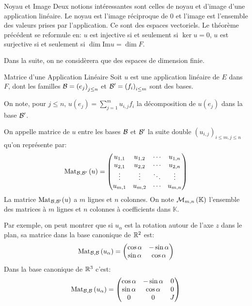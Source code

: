 \documentclass{classe}
\renewcommand*{\K}{\mathbb{K}}
\begin{document}
\begin{remarque}{Noyau et Image}{}
Deux notions intéressantes sont celles de noyau et d'image d'une application linéaire. Le noyau est l'image réciproque de $0$ et l'image est l'ensemble des valeurs prises par l'application.
Ce sont des espaces vectoriels.
Le théorème précédent se reformule en: $u$ est injective si et seulement si $\ker u = 0$, $u$ est surjective si et seulement si $\dim \mathrm{Im} u = \dim F$.
\end{remarque}

Dans la suite, on ne considèrera que des espaces de dimension finie.

\begin{définition}{Matrice d'une Application Linéaire}{}
	Soit $u$ est une application linéaire de $E$ dans $F$, dont les familles $\mathcal{B} = \left(e_{j}\right)_{j\leq n}$ et $\mathcal{B}' = \left(f_{i}\right)_{i\leq m}$ sont des bases.

	On note, pour $j \leq n$, $u\left( e_{j} \right) = \sum_{j = 1}^{m}u_{i, j}f_{i}$ la décomposition de $u(e_{j})$ dans la base $\mathcal{B}'$.

	On appelle matrice de $u$ entre les bases $\mathcal{B}$ et $\mathcal{B}'$ la suite double $\left( u_{i, j} \right)_{i \leq m, j\leq n}$ qu'on représente par:
	\begin{equation*}
		\operatorname{Mat}_{\mathcal{B}, \mathcal{B}'}\left( u \right) = \begin{pmatrix}
			u_{1, 1} & u_{1, 2} & \cdots & u_{1, n}\\
			u_{2, 1} & u_{2, 2} & \cdots & u_{2, n}\\
			\vdots & \vdots & \ddots & \vdots \\
			u_{m, 1} & u_{m, 2} & \cdots & u_{m, n}
		\end{pmatrix}
	\end{equation*}
	La matrice $\operatorname{Mat}_{\mathcal{B}, \mathcal{B}'}(u)$ a $m$ lignes et $n$ colonnes. On note $\M_{m, n}\left( \K \right)$ l'ensemble des matrices à $m$ lignes et $n$ colonnes à coefficients dans $\K$.
\end{définition}

\begin{example}
	Par exemple, on peut montrer que si $u_{\alpha}$ est la rotation autour de l'axe $z$ dans le plan, sa matrice dans la base canonique de $\mathbb{R}^{2}$ est:
	\begin{equation*}
		\operatorname{Mat}_{\mathcal{B}, \mathcal{B}}\left( u_{\alpha} \right) = \begin{pmatrix}
			\cos \alpha & -\sin \alpha\\
			\sin \alpha & \cos \alpha
		\end{pmatrix}
	\end{equation*}
	Dans la base canonique de $\mathbb{R}^{3}$ c'est:
	\begin{equation*}
		\operatorname{Mat}_{\mathcal{B}, \mathcal{B}}\left( u_{\alpha} \right) = \begin{pmatrix}
			\cos \alpha & - \sin \alpha & 0\\
			\sin \alpha & \cos \alpha & 0\\
			0 & 0 & J
		\end{pmatrix}
	\end{equation*}
\end{example}
\end{document}
